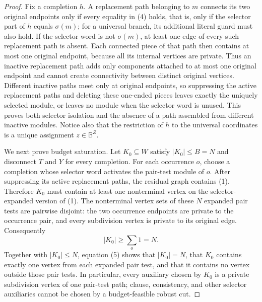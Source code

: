 \documentclass{article}
\begin{document}
\begin{proof}
Fix a completion \(h\).  A replacement path belonging to \(m\) connects its two original endpoints only if every equality in (4) holds, that is, only if the selector part of \(h\) equals \(\sigma(m)\); for a universal branch, its additional literal guard must also hold.  If the selector word is not \(\sigma(m)\), at least one edge of every such replacement path is absent.  Each connected piece of that path then contains at most one original endpoint, because all its internal vertices are private.  Thus an inactive replacement path adds only components attached to at most one original endpoint and cannot create connectivity between distinct original vertices.  Different inactive paths meet only at original endpoints, so suppressing the active replacement paths and deleting these one-ended pieces leaves exactly the uniquely selected module, or leaves no module when the selector word is unused.  This proves both selector isolation and the absence of a path assembled from different inactive modules.  Notice also that the restriction of \(h\) to the universal coordinates is a unique assignment \(z\in\mathbb B^Z\).

We next prove budget saturation.  Let \(K_0\subseteq W\) satisfy \(|K_0|\le B=N\) and disconnect \(T\) and \(Y\) for every completion.  For each occurrence \(o\), choose a completion whose selector word activates the pair-test module of \(o\).  After suppressing its active replacement paths, the residual graph contains (1).  Therefore \(K_0\) must contain at least one nonterminal vertex on the selector-expanded version of (1).  The nonterminal vertex sets of these \(N\) expanded pair tests are pairwise disjoint: the two occurrence endpoints are private to the occurrence pair, and every subdivision vertex is private to its original edge.  Consequently
\[
|K_0|\ge \sum_o 1=N. \tag{5}
\]
Together with \(|K_0|\le N\), equation (5) shows that \(|K_0|=N\), that \(K_0\) contains exactly one vertex from each expanded pair test, and that it contains no vertex outside those pair tests.  In particular, every auxiliary chosen by \(K_0\) is a private subdivision vertex of one pair-test path; clause, consistency, and other selector auxiliaries cannot be chosen by a budget-feasible robust cut.


\end{proof}
\end{document}
